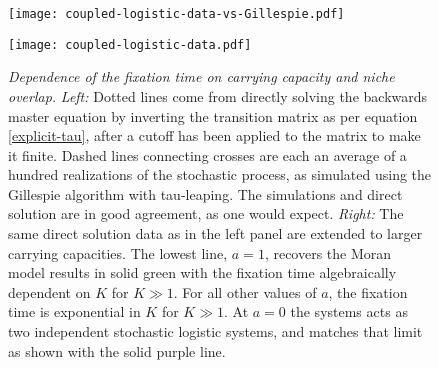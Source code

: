 \iffalse
\begin{figure}[ht]
	\centering
	\texttt{[image: coupled-logistic-data-vs-Gillespie.pdf]}
	\caption{\emph{Directly solving the (truncated) master equation agrees with Gillespie simulations.} Solid lines come from directly solving the backwards master equation by inverting the transition matrix, after a cutoff has been applied to the matrix to make it finite. Dashed lines are each an average of a hundred realizations of the stochastic process, as simulated using the Gillespie algorithm. }
	\label{Gillespie}
\end{figure}
\begin{figure}[ht]
	\centering
	\texttt{[image: \{coupled-logistic-data]}}
	\caption{\emph{Dependence of the fixation time on carrying capacity and niche overlap.}
		The lowest line, $a=1$, recovers the Moran model results with the fixation time algebraically dependent on $K$ for $K\gg 1$. For all other values of $a$, the fixation time is exponential in $K$ for $K\gg 1$.
	} \label{lntauvK}
\end{figure}
\fi
\begin{figure}[h]
	\centering
	\begin{minipage}{0.49\linewidth}
		\centering
		\texttt{[image: coupled-logistic-data-vs-Gillespie.pdf]}
	\end{minipage}
	\begin{minipage}{0.49\linewidth}
		\centering
		\texttt{[image: coupled-logistic-data.pdf]}
	\end{minipage}
	\caption{\emph{Dependence of the fixation time on carrying capacity and niche overlap.}
		\emph{Left:} Dotted lines come from directly solving the backwards master equation by inverting the transition matrix as per equation \ref{explicit-tau}, after a cutoff has been applied to the matrix to make it finite. Dashed lines connecting crosses are each an average of a hundred realizations of the stochastic process, as simulated using the Gillespie algorithm with tau-leaping. The simulations and direct solution are in good agreement, as one would expect. 
		\emph{Right:} The same direct solution data as in the left panel are extended to larger carrying capacities. The lowest line, $a=1$, recovers the Moran model results in solid green with the fixation time algebraically dependent on $K$ for $K\gg 1$. For all other values of $a$, the fixation time is exponential in $K$ for $K\gg 1$. At $a=0$ the systems acts as two independent stochastic logistic systems, and matches that limit as shown with the solid purple line. 
	} \label{lntauvK}
\end{figure}

